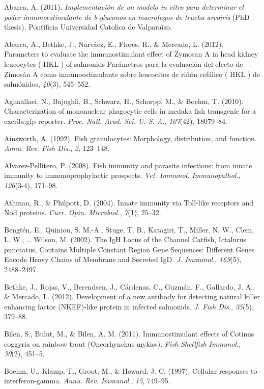\documentclass[12pt,a4paper,]{article}
\begin{document}
Abarca, A. (2011). \emph{Implementación de un modelo in vitro para
determinar el poder inmunoestimulante de b-glucanos en macrofagos de
trucha arcoiris} (PhD thesis). Pontificia Universidad Catolica de
Valparaiso.

Abarca, A., Bethke, J., Narváez, E., Flores, R., \& Mercado, L. (2012).
Parameters to evaluate the immunostimulant effect of Zymosan A in head
kidney leucocytes ( HKL ) of salmonids Parámetros para la evaluación del
efecto de Zimosán A como inmunoestimulante sobre leucocitos de riñón
cefálico ( HKL ) de salmónidos, \emph{40}(3), 545--552.

Aghaallaei, N., Bajoghli, B., Schwarz, H., Schorpp, M., \& Boehm, T.
(2010). Characterization of mononuclear phagocytic cells in medaka fish
transgenic for a cxcr3a:gfp reporter. \emph{Proc. Natl. Acad. Sci. U. S.
A.}, \emph{107}(42), 18079--84.

Ainsworth, A. (1992). Fish granulocytes: Morphology, distribution, and
function. \emph{Annu. Rev. Fish Dis.}, \emph{2}, 123--148.

Alvarez-Pellitero, P. (2008). Fish immunity and parasite infections:
from innate immunity to immunoprophylactic prospects. \emph{Vet.
Immunol. Immunopathol.}, \emph{126}(3-4), 171--98.

Athman, R., \& Philpott, D. (2004). Innate immunity via Toll-like
receptors and Nod proteins. \emph{Curr. Opin. Microbiol.}, \emph{7}(1),
25--32.

Bengtén, E., Quiniou, S. M.-A., Stuge, T. B., Katagiri, T., Miller, N.
W., Clem, L. W., \ldots{} Wilson, M. (2002). The IgH Locus of the
Channel Catfish, Ictalurus punctatus, Contains Multiple Constant Region
Gene Sequences: Different Genes Encode Heavy Chains of Membrane and
Secreted IgD. \emph{J. Immunol.}, \emph{169}(5), 2488--2497.

Bethke, J., Rojas, V., Berendsen, J., Cárdenas, C., Guzmán, F.,
Gallardo, J. A., \& Mercado, L. (2012). Development of a new antibody
for detecting natural killer enhancing factor (NKEF)-like protein in
infected salmonids. \emph{J. Fish Dis.}, \emph{35}(5), 379--88.

Bilen, S., Bulut, M., \& Bilen, A. M. (2011). Immunostimulant effects of
Cotinus coggyria on rainbow trout (Oncorhynchus mykiss). \emph{Fish
Shellfish Immunol.}, \emph{30}(2), 451--5.

Boehm, U., Klamp, T., Groot, M., \& Howard, J. C. (1997). Cellular
responses to interferon-gamma. \emph{Annu. Rev. Immunol.}, \emph{15},
749--95.
\end{document}
